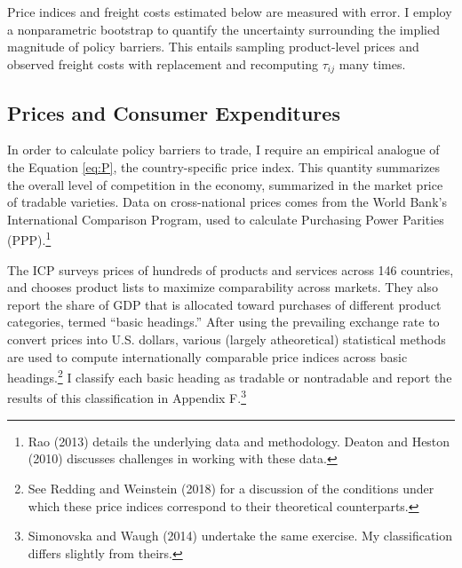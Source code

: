 \documentclass{puthesis}
\begin{document}
Price indices and freight costs estimated below are measured with error.
I employ a nonparametric bootstrap to quantify the uncertainty
surrounding the implied magnitude of policy barriers. This entails
sampling product-level prices and observed freight costs with
replacement and recomputing \(\tau_{ij}\) many times.

\subsection{Prices and Consumer Expenditures}

In order to calculate policy barriers to trade, I require an empirical
analogue of the Equation \ref{eq:P}, the country-specific price index.
This quantity summarizes the overall level of competition in the
economy, summarized in the market price of tradable varieties. Data on
cross-national prices comes from the World Bank's International
Comparison Program, used to calculate Purchasing Power Parities
(PPP).\footnote{Rao (2013) details the underlying data and methodology.
  Deaton and Heston (2010) discusses challenges in working with these
  data.}

The ICP surveys prices of hundreds of products and services across 146
countries, and chooses product lists to maximize comparability across
markets. They also report the share of GDP that is allocated toward
purchases of different product categories, termed ``basic headings.''
After using the prevailing exchange rate to convert prices into U.S.
dollars, various (largely atheoretical) statistical methods are used to
compute internationally comparable price indices across basic
headings.\footnote{See Redding and Weinstein (2018) for a discussion of
  the conditions under which these price indices correspond to their
  theoretical counterparts.} I classify each basic heading as tradable
or nontradable and report the results of this classification in Appendix
F.\footnote{Simonovska and Waugh (2014) undertake the same exercise. My
  classification differs slightly from theirs.}
\end{document}
